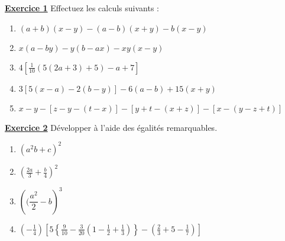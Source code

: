 \documentclass[12pt,a4paper]{article}
\newcommand{\exo}[1]{%
        \textbf{\underline{Exercice #1}}
}
\begin{document}
\renewcommand{\arraystretch}{1.5}
\renewcommand{\arrayrulewidth}{1.2pt}
\vspace{4cm}

\exo{1} Effectuez les calculs suivants :
\begin{enumerate}[align=left]
    \item \( (a + b)(x - y) - (a - b)(x + y) - b(x - y) \)
    \item \( x(a - by) - y(b - ax) - xy(x - y) \)
    \item \( 4 \left[ \frac{1}{10}(5(2a + 3) + 5) - a + 7 \right] \)
    \item \( 3[5(x - a) - 2(b - y)] - 6(a - b) + 15(x + y) \)
    \item \( x - y - [z - y - (t - x)] - [y + t - (x + z)] - [x - (y - z + t)] \)
\end{enumerate}

\exo{2} Développer à l’aide des égalités remarquables.
\begin{enumerate}
    \item \( (a^2b + c)^2 \)
    \item \( \left( \frac{2a}{3} + \frac{b}{4} \right)^2 \)
    \item \( \left(( \dfrac{a^{2}}{2} - b \right)^3 \)
    \item \( \left( -\frac{1}{4} \right) \left[ 5 \left\{ \frac{9}{10} - \frac{3}{20}\left( 1 - \frac{1}{2} + \frac{1}{3} \right) \right\} - \left( \frac{2}{3} + 5 - \frac{1}{7} \right) \right] \)
\end{enumerate}
\end{document}
